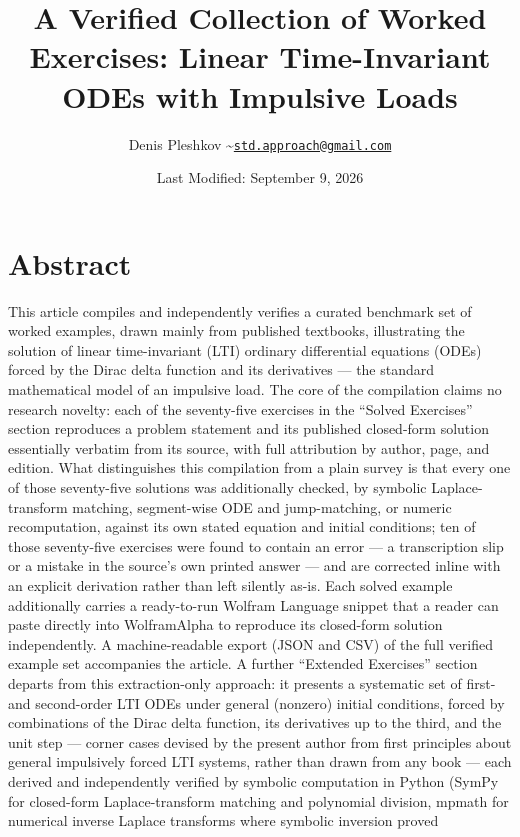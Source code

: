 \documentclass[
  11pt,
]{article}
\title{A Verified Collection of Worked Exercises: Linear Time-Invariant
ODEs with Impulsive Loads}
\author{Denis Pleshkov
\textasciitilde{}\href{mailto:std.approach@gmail.com}{\nolinkurl{std.approach@gmail.com}}}
\date{Last Modified: September 9, 2026}
\begin{document}
\maketitle

{
\hypersetup{linkcolor=}
\setcounter{tocdepth}{3}
\tableofcontents
}
\hypertarget{abstract}{%
\section{Abstract}\label{abstract}}

This article compiles and independently verifies a curated benchmark set
of worked examples, drawn mainly from published textbooks, illustrating
the solution of linear time-invariant (LTI) ordinary differential
equations (ODEs) forced by the Dirac delta function and its derivatives
--- the standard mathematical model of an impulsive load. The core of
the compilation claims no research novelty: each of the seventy-five
exercises in the ``Solved Exercises'' section reproduces a problem
statement and its published closed-form solution essentially verbatim
from its source, with full attribution by author, page, and edition.
What distinguishes this compilation from a plain survey is that every
one of those seventy-five solutions was additionally checked, by
symbolic Laplace-transform matching, segment-wise ODE and jump-matching,
or numeric recomputation, against its own stated equation and initial
conditions; ten of those seventy-five exercises were found to contain an
error --- a transcription slip or a mistake in the source's own printed
answer --- and are corrected inline with an explicit derivation rather
than left silently as-is. Each solved example additionally carries a
ready-to-run Wolfram Language snippet that a reader can paste directly
into WolframAlpha to reproduce its closed-form solution independently. A
machine-readable export (JSON and CSV) of the full verified example set
accompanies the article. A further ``Extended Exercises'' section
departs from this extraction-only approach: it presents a systematic set
of first- and second-order LTI ODEs under general (nonzero) initial
conditions, forced by combinations of the Dirac delta function, its
derivatives up to the third, and the unit step --- corner cases devised
by the present author from first principles about general impulsively
forced LTI systems, rather than drawn from any book --- each derived and
independently verified by symbolic computation in Python (SymPy for
closed-form Laplace-transform matching and polynomial division, mpmath
for numerical inverse Laplace transforms where symbolic inversion proved
\end{document}
